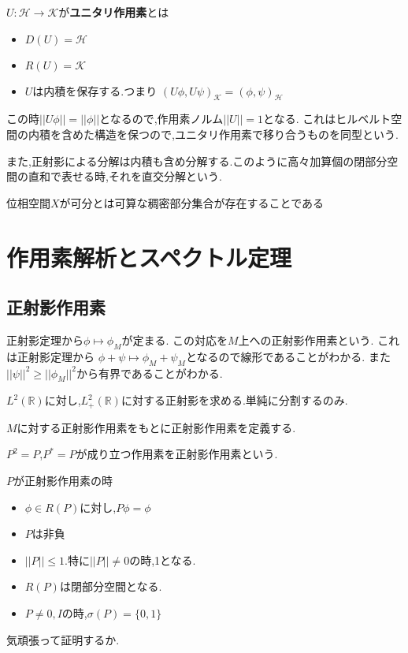 \documentclass[uplatex]{jsbook}
\begin{document}
\begin{screen}
\begin{dfn}
  $U: \mathcal{H} \to \mathcal{K}$が\textbf{ユニタリ作用素}とは
\begin{itemize}
  \item $D(U) = \mathcal{H}$
  \item $R(U) = \mathcal{K}$
  \item $U$は内積を保存する.つまり
  $(U\phi, U\psi)_{\mathcal{K}} = (\phi, \psi)_{\mathcal{H}}$
\end{itemize}
\end{dfn}
\end{screen}
この時$||U\phi|| = ||\phi||$となるので,作用素ノルム$||U|| = 1$となる.
これはヒルベルト空間の内積を含めた構造を保つので,ユニタリ作用素で移り合うものを同型という.

また,正射影による分解は内積も含め分解する.このように高々加算個の閉部分空間の直和で表せる時,それを$\textbf{直交分解}$という.


\begin{screen}
\begin{dfn}
 位相空間$X$が可分とは可算な稠密部分集合が存在することである
\end{dfn}
\end{screen}

\chapter{作用素解析とスペクトル定理}
\section{正射影作用素}
正射影定理から$\phi \mapsto \phi_M$が定まる.
この対応を$M$上への正射影作用素という.
これは正射影定理から
$\phi + \psi \mapsto \phi_M + \psi_M$となるので線形であることがわかる.
また$||\psi||^2 \ge ||\phi_M||^2$から有界であることがわかる.

\begin{epl}
  $L^2(\mathbb{R})$に対し,$L^2_+(\mathbb{R})$に対する正射影を求める.単純に分割するのみ.
\end{epl}

$M$に対する正射影作用素をもとに正射影作用素を定義する.
\begin{screen}
\begin{dfn}
 $P^2 = P$,$P^* = P$が成り立つ作用素を正射影作用素という.
\end{dfn}
\end{screen}

\begin{prop}
$P$が正射影作用素の時
 \begin{itemize}
   \item $\phi \in R(P)$に対し,$P\phi = \phi$
   \item $P$は非負
   \item $||P|| \le 1$.特に$||P|| \neq 0$の時,1となる.
   \item $R(P)$は閉部分空間となる.
   \item $P \neq 0, I$の時,$\sigma(P) = \{0, 1\}$
 \end{itemize}
\end{prop}
気頑張って証明するか.
\end{document}
